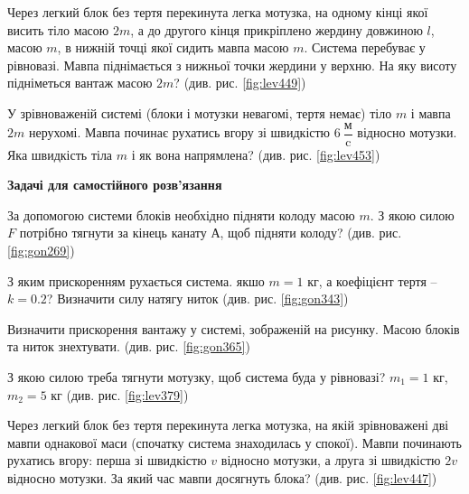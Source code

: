\begin{problem}{10}
	Через легкий блок без тертя перекинута легка мотузка, на одному кінці якої висить тіло масою $2m$, а до другого кінця прикріплено жердину довжиною $l$, масою $m$, в нижній точці якої сидить
	мавпа масою $m$. Система перебуває у рівновазі. Мавпа піднімається з нижньої точки жердини у верхню. На яку висоту підніметься
	вантаж масою $2m$? (див. рис. \ref{fig:lev449})
\end{problem}




\begin{problem}{12}
	 У зрівноваженій системі (блоки і мотузки невагомі, тертя немає) тіло $m$ і мавпа $2m$ нерухомі. Мавпа починає рухатись вгору зі швидкістю $6~\dfrac{\text{м}}{\text{c}} $ відносно мотузки. Яка швидкість тіла
	$m$ і як вона напрямлена? (див. рис. \ref{fig:lev453})
\end{problem}



\textbf{Задачі для самостійного розв'язання}

\begin{problem}{2}
	За допомогою системи блоків необхідно підняти колоду масою $m$. З якою силою $F$ потрібно тягнути за кінець канату А, щоб підняти колоду? (див. рис. \ref{fig:gon269})
\end{problem}


\begin{problem}{3}
	З яким прискоренням рухається система. якшо $m = 1$ кг, а коефіцієнт тертя -- $k = 0.2$? Визначити силу натягу ниток (див. рис. \ref{fig:gon343})
\end{problem}

\begin{problem}{6}
	Визначити прискорення вантажу у системі, зображеній на рисунку. Масою блоків та ниток знехтувати. (див. рис. \ref{fig:gon365})	
\end{problem}

\begin{problem}{7}
	З якою силою треба тягнути мотузку, щоб система буда у рівновазі? $m_1 = 1$ кг, $m_2 = 5$ кг (див. рис. \ref{fig:lev379})
\end{problem}

\begin{problem}{9}
	Через легкий блок без тертя перекинута легка мотузка, на якій зрівноважені дві мавпи однакової маси (спочатку система знаходилась у спокої). Мавпи починають рухатись вгору: перша зі швидкістю $v$ відносно мотузки, а лруга зі швидкістю $2v$ відносно мотузки. За який час мавпи досягнуть блока? (див. рис. \ref{fig:lev447})
\end{problem}

